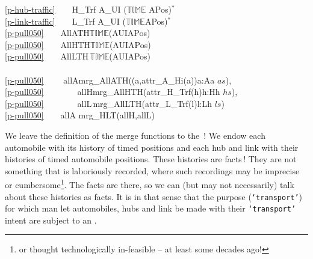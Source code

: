 \ref{p-hub-traffic}\ \ \ \ H\_Trf {\EQ} A\_UI {\MARROW} ($\mathbb{TIME}$ {\TIMES} APos)$^{\ast}$\\
\ref{p-link-traffic}\ \ \ \ L\_Trf {\EQ} A\_UI{\MARROW} ($\mathbb{TIME}${\TIMES}APos)$^{\ast}$  \\
\ref{p-pull050}\ \ \ \ AllATH{\EQ}$\mathbb{TIME}${\MARROW}(AUI{\MARROW}APos) \\
\ref{p-pull050}\ \ \ \ AllHTH{\EQ}$\mathbb{TIME}${\MARROW}(AUI{\MARROW}APos) \\
\ref{p-pull050}\ \ \ \ AllLTH\,{\EQ}$\mathbb{TIME}${\MARROW}(AUI{\MARROW}APos) \\
\\
\ref{p-pull050}\ \ \ \  allA{\EQ}mrg\_AllATH({\LBRACE}(a,attr\_A\_Hi(a)){\BAR}a:A{\RDOT}a {\ISIN} $as${\RBRACE}),\\
\ref{p-pull050}\ \ \ \ \ \ \ \ allH{\EQ}mrg\_AllHTH({\LBRACE}attr\_H\_Trf(h){\BAR}h:H{\RDOT}h {\ISIN} $hs${\RBRACE}),\\
\ref{p-pull050}\ \ \ \ \ \ \ \ allL\,{\EQ}mrg\_AllLTH({\LBRACE}attr\_L\_Trf(l){\BAR}l:L{\RDOT}h {\ISIN} $ls${\RBRACE}) \\
\ref{p-pull050}\ \ \ \ allA {\EQ} mrg\_HLT(allH,allL) 
\ep

\mnewfoil
\noindent%
\normalsize\HHHH\rm
\begynd%
\pind We leave the definition of the  \textsf{merge} functions
      to the \,!
\begynd
\pind We endow 
\begynd
\pind each automobile with its history of timed positions and
\pind each hub and link with  their histories of timed automobile positions.
\afslut 
\pind These histories  are facts\,!
\pind They are not something that is laboriously recorded, \nyl 
      where such recordings may be imprecise or cumbersome\footnote{\LLLL or
      thought technologically in-feasible -- at least some decades
      ago!}.
\pind The facts are there, so we can (but may not necessarily) \nyl talk
      about these histories as facts.
\mnewfoil
\pind It is in that sense that the purpose (\texttt{`transport'})
\begynd
\pind for which man let automobiles, hubs and link be made 
\pind with their \texttt{`transport'} intent
\pind are subject to an 
\afslut
\afslut
\pind {}.
\afslut
\normalsize\HHHH\rm

\mnewfoil
   

